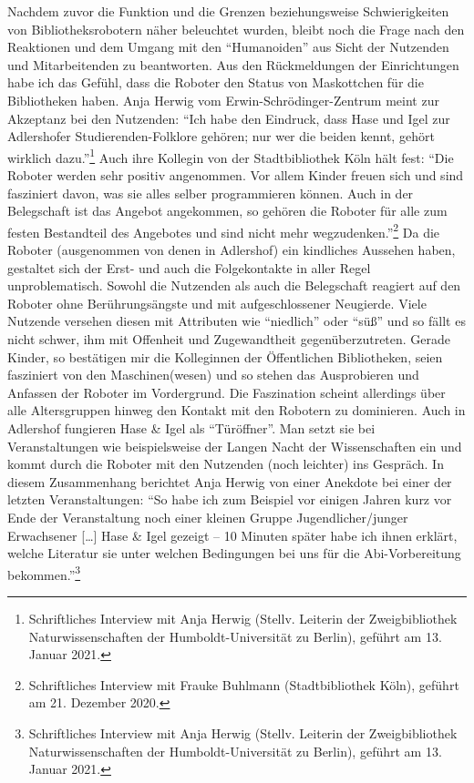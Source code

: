 \documentclass[a4paper,
fontsize=11pt,
oneside,
numbers=noperiodatend,
parskip=half-,
bibliography=totoc,
final
]{scrartcl}
\begin{document}
Nachdem zuvor die Funktion und die Grenzen beziehungsweise
Schwierigkeiten von Bibliotheksrobotern näher beleuchtet wurden, bleibt
noch die Frage nach den Reaktionen und dem Umgang mit den
\enquote{Humanoiden} aus Sicht der Nutzenden und Mitarbeitenden zu
beantworten. Aus den Rückmeldungen der Einrichtungen habe ich das
Gefühl, dass die Roboter den Status von Maskottchen für die Bibliotheken
haben. Anja Herwig vom Erwin-Schrödinger-Zentrum meint zur Akzeptanz bei
den Nutzenden: \enquote{Ich habe den Eindruck, dass Hase und Igel zur
Adlershofer Studierenden-Folklore gehören; nur wer die beiden kennt,
gehört wirklich dazu.}\footnote{Schriftliches Interview mit Anja Herwig
  (Stellv. Leiterin der Zweigbibliothek Naturwissenschaften der
  Humboldt-Universität zu Berlin), geführt am 13. Januar 2021.} Auch
ihre Kollegin von der Stadtbibliothek Köln hält fest: \enquote{Die
Roboter werden sehr positiv angenommen. Vor allem Kinder freuen sich und
sind fasziniert davon, was sie alles selber programmieren können. Auch
in der Belegschaft ist das Angebot angekommen, so gehören die Roboter
für alle zum festen Bestandteil des Angebotes und sind nicht mehr
wegzudenken.}\footnote{Schriftliches Interview mit Frauke Buhlmann
  (Stadtbibliothek Köln), geführt am 21. Dezember 2020.} Da die Roboter
(ausgenommen von denen in Adlershof) ein kindliches Aussehen haben,
gestaltet sich der Erst- und auch die Folgekontakte in aller Regel
unproblematisch. Sowohl die Nutzenden als auch die Belegschaft reagiert
auf den Roboter ohne Berührungsängste und mit aufgeschlossener
Neugierde. Viele Nutzende versehen diesen mit Attributen wie
\enquote{niedlich} oder \enquote{süß} und so fällt es nicht schwer, ihm
mit Offenheit und Zugewandtheit gegenüberzutreten. Gerade Kinder, so
bestätigen mir die Kolleginnen der Öffentlichen Bibliotheken, seien
fasziniert von den Maschinen(wesen) und so stehen das Ausprobieren und
Anfassen der Roboter im Vordergrund. Die Faszination scheint allerdings
über alle Altersgruppen hinweg den Kontakt mit den Robotern zu
dominieren. Auch in Adlershof fungieren Hase \& Igel als
\enquote{Türöffner}. Man setzt sie bei Veranstaltungen wie
beispielsweise der Langen Nacht der Wissenschaften ein und kommt durch
die Roboter mit den Nutzenden (noch leichter) ins Gespräch. In diesem
Zusammenhang berichtet Anja Herwig von einer Anekdote bei einer der
letzten Veranstaltungen: \enquote{So habe ich zum Beispiel vor einigen
Jahren kurz vor Ende der Veranstaltung noch einer kleinen Gruppe
Jugendlicher/junger Erwachsener {[}\ldots{]} Hase \& Igel gezeigt -- 10
Minuten später habe ich ihnen erklärt, welche Literatur sie unter
welchen Bedingungen bei uns für die Abi-Vorbereitung
bekommen.}\footnote{Schriftliches Interview mit Anja Herwig (Stellv.
  Leiterin der Zweigbibliothek Naturwissenschaften der
  Humboldt-Universität zu Berlin), geführt am 13. Januar 2021.}
\end{document}

